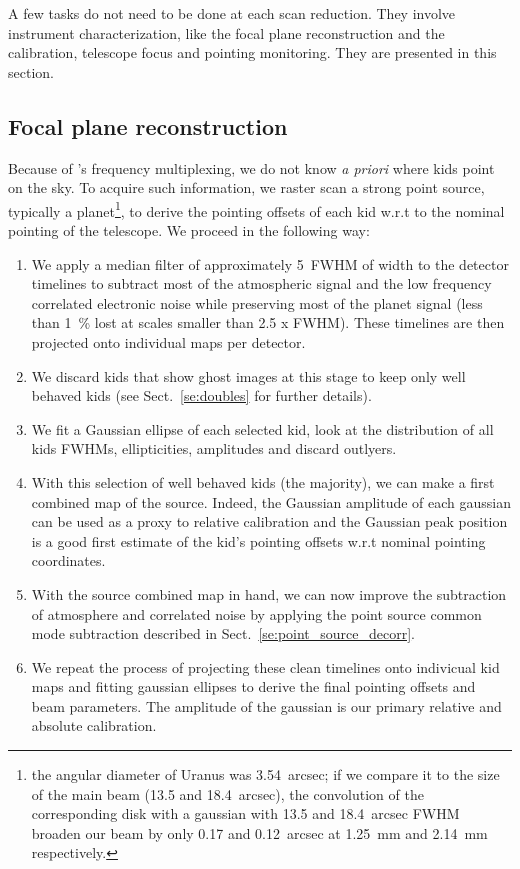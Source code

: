 

A few tasks do not need to be done at each scan reduction. They involve
instrument characterization, like the focal plane reconstruction and the
calibration, telescope focus and pointing monitoring. They are presented in this
section.

\subsection{Focal plane reconstruction}

Because of \nika's frequency multiplexing, we do not know {\it a priori} where
kids point on the sky. To acquire such information, we raster scan a strong
point source, typically a planet\footnote{ the
  angular diameter of Uranus was 3.54~arcsec; if we compare it to the size of
  the main beam (13.5 and 18.4~arcsec), the convolution of the corresponding
  disk with a gaussian with 13.5 and 18.4~arcsec FWHM broaden our beam by only
  0.17 and 0.12~arcsec at 1.25~mm and 2.14~mm respectively.}, to derive the
pointing offsets of each kid w.r.t to the nominal pointing of the telescope. We
proceed in the following way:

\begin{enumerate}
\item We apply a median filter of approximately 5~FWHM of width to the detector
  timelines to subtract most of the atmospheric signal and the low frequency
  correlated electronic noise while preserving most of the planet signal (less
  than 1~\% lost at scales smaller than 2.5 x FWHM). These timelines are then
  projected onto individual maps per detector.
\item We discard kids that show ghost images at this stage to keep only well
  behaved kids (see Sect.~\ref{se:doubles} for further details).
\item We fit a Gaussian ellipse of each selected kid, look at the distribution
  of all kids FWHMs, ellipticities, amplitudes and discard outlyers.
\item With this selection of well behaved kids (the majority), we can make a
  first combined map of the source. Indeed, the Gaussian amplitude of each
  gaussian can be used as a proxy to relative calibration and the Gaussian peak
  position is a good first estimate of the kid's pointing offsets w.r.t nominal
  pointing coordinates.
\item With the source combined map in hand, we can now improve the subtraction
  of atmosphere and correlated noise by applying the point source common mode
  subtraction described in Sect.~\ref{se:point_source_decorr}.
\item We repeat the process of projecting these clean timelines onto indivicual
  kid maps and fitting gaussian ellipses to derive the final pointing offsets
  and beam parameters. The amplitude of the gaussian is our primary relative and
  absolute calibration.
\end{enumerate}

